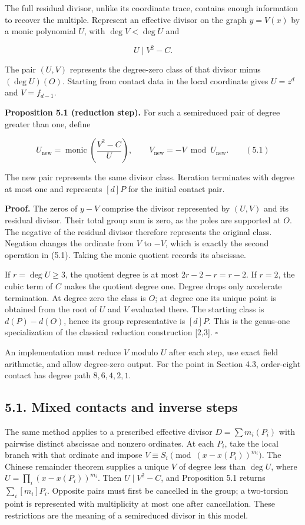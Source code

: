 \documentclass[
  11pt,
  a4paper,
]{article}
\begin{document}
The full residual divisor, unlike its coordinate trace, contains enough
information to recover the multiple. Represent an effective divisor on
the graph \(y=V(x)\) by a monic polynomial \(U\), with \(\deg V<\deg U\)
and

\[
U\mid V^2-C.
\]

The pair \((U,V)\) represents the degree-zero class of that divisor
minus \((\deg U)(O)\). Starting from contact data in the local
coordinate gives \(U=z^d\) and \(V=f_{d-1}\).

\textbf{Proposition 5.1 (reduction step).} For such a semireduced pair
of degree greater than one, define

\[
U_{\mathrm{new}}=\operatorname{monic}\left(\frac{V^2-C}{U}\right),\qquad
V_{\mathrm{new}}=-V\bmod U_{\mathrm{new}}. \qquad (5.1)
\]

The new pair represents the same divisor class. Iteration terminates
with degree at most one and represents \([d]P\) for the initial contact
pair.

\textbf{Proof.} The zeros of \(y-V\) comprise the divisor represented by
\((U,V)\) and its residual divisor. Their total group sum is zero, as
the poles are supported at \(O\). The negative of the residual divisor
therefore represents the original class. Negation changes the ordinate
from \(V\) to \(-V\), which is exactly the second operation in (5.1).
Taking the monic quotient records its abscissae.

If \(r=\deg U\geq3\), the quotient degree is at most \(2r-2-r=r-2\). If
\(r=2\), the cubic term of \(C\) makes the quotient degree one. Degree
drops only accelerate termination. At degree zero the class is \(O\); at
degree one its unique point is obtained from the root of \(U\) and \(V\)
evaluated there. The starting class is \(d(P)-d(O)\), hence its group
representative is \([d]P\). This is the genus-one specialization of the
classical reduction construction {[}2,3{]}. \(\square\)

An implementation must reduce \(V\) modulo \(U\) after each step, use
exact field arithmetic, and allow degree-zero output. For the point in
Section 4.3, order-eight contact has degree path \(8,6,4,2,1\).

\subsection{5.1. Mixed contacts and inverse
steps}\label{mixed-contacts-and-inverse-steps}

The same method applies to a prescribed effective divisor
\(D=\sum m_i(P_i)\) with pairwise distinct abscissae and nonzero
ordinates. At each \(P_i\), take the local branch with that ordinate and
impose \(V\equiv S_i\pmod{(x-x(P_i))^{m_i}}\). The Chinese remainder
theorem supplies a unique \(V\) of degree less than \(\deg U\), where
\(U=\prod_i(x-x(P_i))^{m_i}\). Then \(U\mid V^2-C\), and Proposition 5.1
returns \(\sum_i[m_i]P_i\). Opposite pairs must first be cancelled in
the group; a two-torsion point is represented with multiplicity at most
one after cancellation. These restrictions are the meaning of a
semireduced divisor in this model.
\end{document}
